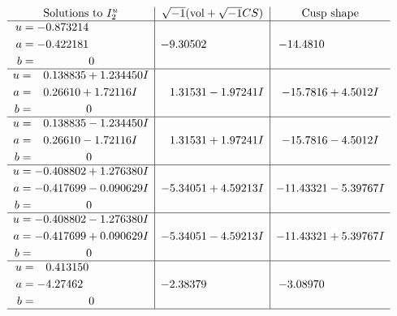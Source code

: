 \documentclass[1p]{elsarticle_modified}
\theoremstyle{definition}
\newcommand{\I}{\sqrt{-1}}
\begin{document}
$$\begin{array}{c|c|c}  
\text{Solutions to }I^u_{2}& \I (\text{vol} + \sqrt{-1}CS) & \text{Cusp shape}\\
 \hline 
\begin{aligned}
u &= -0.873214\phantom{ +0.000000I} \\
a &= -0.422181\phantom{ +0.000000I} \\
b &= \phantom{-0.000000 } 0\end{aligned}
 & -9.30502\phantom{ +0.000000I} & -14.4810\phantom{ +0.000000I} \\ \hline\begin{aligned}
u &= \phantom{-}0.138835 + 1.234450 I \\
a &= \phantom{-}0.26610 + 1.72116 I \\
b &= \phantom{-0.000000 } 0\end{aligned}
 & \phantom{-}1.31531 - 1.97241 I & -15.7816 + 4.5012 I \\ \hline\begin{aligned}
u &= \phantom{-}0.138835 - 1.234450 I \\
a &= \phantom{-}0.26610 - 1.72116 I \\
b &= \phantom{-0.000000 } 0\end{aligned}
 & \phantom{-}1.31531 + 1.97241 I & -15.7816 - 4.5012 I \\ \hline\begin{aligned}
u &= -0.408802 + 1.276380 I \\
a &= -0.417699 - 0.090629 I \\
b &= \phantom{-0.000000 } 0\end{aligned}
 & -5.34051 + 4.59213 I & -11.43321 - 5.39767 I \\ \hline\begin{aligned}
u &= -0.408802 - 1.276380 I \\
a &= -0.417699 + 0.090629 I \\
b &= \phantom{-0.000000 } 0\end{aligned}
 & -5.34051 - 4.59213 I & -11.43321 + 5.39767 I \\ \hline\begin{aligned}
u &= \phantom{-}0.413150\phantom{ +0.000000I} \\
a &= -4.27462\phantom{ +0.000000I} \\
b &= \phantom{-0.000000 } 0\end{aligned}
 & -2.38379\phantom{ +0.000000I} & -3.08970\phantom{ +0.000000I}\\
 \hline 
 \end{array}$$\newpage\newpage\renewcommand{\arraystretch}{1}
\end{document}
